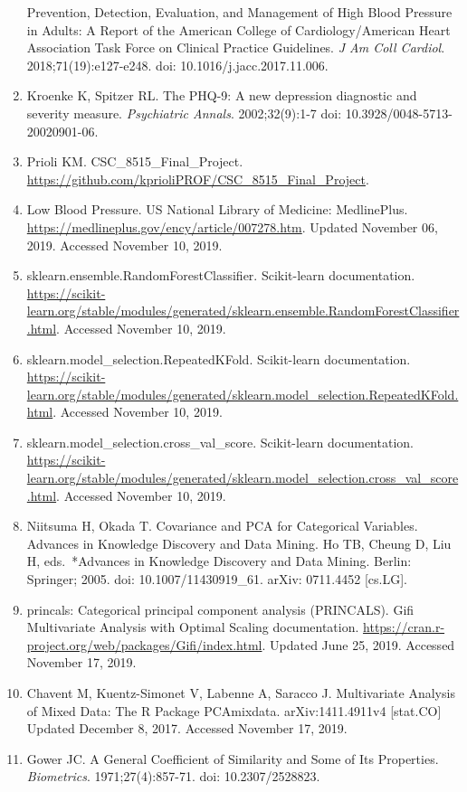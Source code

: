 \documentclass[]{article}
\begin{document}
\begin{enumerate}
  Prevention, Detection, Evaluation, and Management of High Blood
  Pressure in Adults: A Report of the American College of
  Cardiology/American Heart Association Task Force on Clinical Practice
  Guidelines. \emph{J Am Coll Cardiol}. 2018;71(19):e127-e248. doi:
  10.1016/j.jacc.2017.11.006.
\item
  Kroenke K, Spitzer RL. The PHQ-9: A new depression diagnostic and
  severity measure. \emph{Psychiatric Annals}. 2002;32(9):1-7 doi:
  10.3928/0048-5713-20020901-06.
\item
  Prioli KM. CSC\_8515\_Final\_Project.
  \url{https://github.com/kprioliPROF/CSC_8515_Final_Project}.
\item
  Low Blood Pressure. US National Library of Medicine: MedlinePlus.
  \url{https://medlineplus.gov/ency/article/007278.htm}. Updated
  November 06, 2019. Accessed November 10, 2019.
\item
  sklearn.ensemble.RandomForestClassifier. Scikit-learn documentation.
  \url{https://scikit-learn.org/stable/modules/generated/sklearn.ensemble.RandomForestClassifier.html}.
  Accessed November 10, 2019.
\item
  sklearn.model\_selection.RepeatedKFold. Scikit-learn documentation.
  \url{https://scikit-learn.org/stable/modules/generated/sklearn.model_selection.RepeatedKFold.html}.
  Accessed November 10, 2019.
\item
  sklearn.model\_selection.cross\_val\_score. Scikit-learn
  documentation.
  \url{https://scikit-learn.org/stable/modules/generated/sklearn.model_selection.cross_val_score.html}.
  Accessed November 10, 2019.
\item
  Niitsuma H, Okada T. Covariance and PCA for Categorical Variables.
  Advances in Knowledge Discovery and Data Mining. Ho TB, Cheung D, Liu
  H, eds.~*Advances in Knowledge Discovery and Data Mining. Berlin:
  Springer; 2005. doi: 10.1007/11430919\_61. arXiv: 0711.4452
  {[}cs.LG{]}.
\item
  princals: Categorical principal component analysis (PRINCALS). Gifi
  Multivariate Analysis with Optimal Scaling documentation.
  \url{https://cran.r-project.org/web/packages/Gifi/index.html}. Updated
  June 25, 2019. Accessed November 17, 2019.
\item
  Chavent M, Kuentz-Simonet V, Labenne A, Saracco J. Multivariate
  Analysis of Mixed Data: The R Package PCAmixdata. arXiv:1411.4911v4
  {[}stat.CO{]} Updated December 8, 2017. Accessed November 17, 2019.
\item
  Gower JC. A General Coefficient of Similarity and Some of Its
  Properties. \emph{Biometrics}. 1971;27(4):857-71. doi:
  10.2307/2528823.
\end{enumerate}
\end{document}
